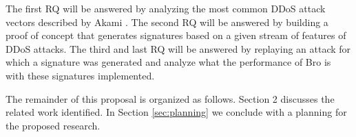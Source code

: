 The first RQ will be answered by analyzing the most common DDoS attack vectors described by Akami \cite{Akamai2017-4}. The second RQ will be answered by building a proof of concept that generates signatures based on a given stream of features of DDoS attacks. The third and last RQ will be answered by replaying an attack for which a signature was generated and analyze what the performance of Bro is with these signatures implemented. 










 
The remainder of this proposal is organized as follows. Section 2 discusses the related work identified. In Section \ref{sec:planning} we conclude with a planning for the proposed research. 
